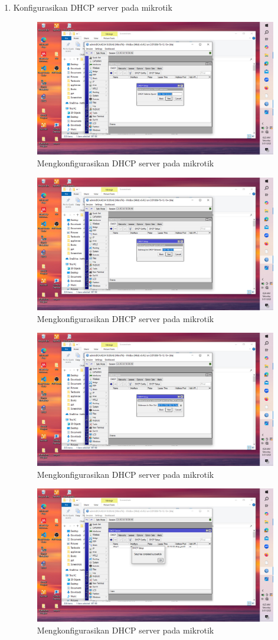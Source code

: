 \begin{enumerate}
\begin{figure}[H]
        \label{fig:menambahkan-ip-ether7}
    \end{figure}
    \item Konfigurasikan DHCP server pada mikrotik
     \begin{figure}[H]
        \centering
        \includegraphics[width=0.5\linewidth]{gambar4a.jpeg}
        \caption{Mengkonfigurasikan DHCP server pada mikrotik}
        \label{fig:mengkonfigurasikan-dhcp-server-mikrotik}
    \end{figure}

    \begin{figure}[H]
        \centering
        \includegraphics[width=0.5\linewidth]{gambar4b.jpeg}
        \caption{Mengkonfigurasikan DHCP server pada mikrotik}
        \label{fig:mengkonfigurasikan-dhcp-server-mikrotik}
    \end{figure}

    \begin{figure}[H]
        \centering
        \includegraphics[width=0.5\linewidth]{gambar4c.jpeg}
        \caption{Mengkonfigurasikan DHCP server pada mikrotik}
        \label{fig:mengkonfigurasikan-dhcp-server-mikrotik}
    \end{figure}
    
    \begin{figure}[H]
        \centering
        \includegraphics[width=0.5\linewidth]{gambar4d.jpeg}
        \caption{Mengkonfigurasikan DHCP server pada mikrotik}
        \label{fig:mengkonfigurasikan-dhcp-server-mikrotik}
    \end{figure}
    

\end{enumerate}
